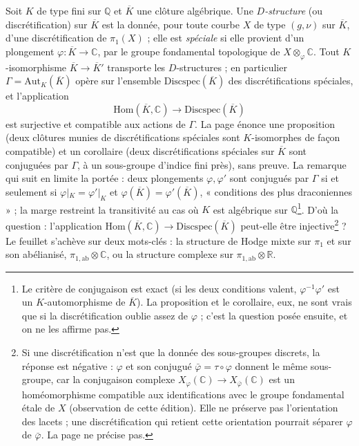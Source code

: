 \documentclass[11pt,a4paper]{article}
\begin{document}
Soit $K$ de type fini sur $\mathbb{Q}$ et $\overline{K}$ une clôture
algébrique. Une \emph{$D$-structure} (ou discrétification) sur $\overline{K}$
est la donnée, pour toute courbe $X$ de type $(g, \nu)$ sur $\overline{K}$,
d'une discrétification de $\pi_1(X)$ ; elle est \emph{spéciale} si elle
provient d'un plongement $\varphi : \overline{K} \to \mathbb{C}$, par le
groupe fondamental topologique de $X \otimes_\varphi \mathbb{C}$. Tout
$K$-isomorphisme $\overline{K} \to \overline{K}'$ transporte les
$D$-structures ; en particulier $\Gamma = \mathrm{Aut}_K(\overline{K})$ opère
sur l'ensemble $\mathrm{Discspec}(\overline{K})$ des discrétifications
spéciales, et l'application
\[
\mathrm{Hom}(\overline{K}, \mathbb{C}) \longrightarrow \mathrm{Discspec}(\overline{K})
\]
est surjective et compatible aux actions de $\Gamma$. La page énonce une
proposition (deux clôtures munies de discrétifications spéciales sont
$K$-isomorphes de façon compatible) et un corollaire (deux
discrétifications spéciales sur $\overline{K}$ sont conjuguées par $\Gamma$, à
un sous-groupe d'indice fini près), sans preuve. La remarque qui suit en
limite la portée : deux plongements $\varphi, \varphi'$ sont conjugués par
$\Gamma$ si et seulement si $\varphi|_K = \varphi'|_K$ et
$\varphi(\overline{K}) = \varphi'(\overline{K})$, « conditions des plus
draconiennes » ; la marge restreint la transitivité au cas où $K$ est
algébrique sur $\mathbb{Q}$\footnote{Le critère de conjugaison est exact (si
les deux conditions valent, $\varphi^{-1}\varphi'$ est un $K$-automorphisme de
$\overline{K}$). La proposition et le corollaire, eux, ne sont vrais que si la
discrétification oublie assez de $\varphi$ ; c'est la question
posée ensuite, et on ne les affirme pas.}. D'où la question : l'application
$\mathrm{Hom}(\overline{K}, \mathbb{C}) \to \mathrm{Discspec}(\overline{K})$
peut-elle être injective\footnote{Si une discrétification n'est que la donnée
des sous-groupes discrets, la réponse est négative : $\varphi$ et son
conjugué $\bar\varphi = \tau \circ \varphi$ donnent le même sous-groupe, car
la conjugaison complexe $X_\varphi(\mathbb{C}) \to X_{\bar\varphi}(\mathbb{C})$
est un homéomorphisme compatible aux identifications avec le groupe
fondamental étale de $X$ (observation de cette édition). Elle ne préserve pas
l'orientation des lacets ; une discrétification qui retient cette orientation
pourrait séparer $\varphi$ de $\bar\varphi$. La page ne précise pas.} ? Le
feuillet s'achève sur deux mots-clés : la structure de Hodge mixte sur
$\pi_1$ et sur son abélianisé, $\pi_{1,\mathrm{ab}} \otimes \mathbb{C}$, ou
la structure complexe sur $\pi_{1,\mathrm{ab}} \otimes \mathbb{R}$.
\end{document}

